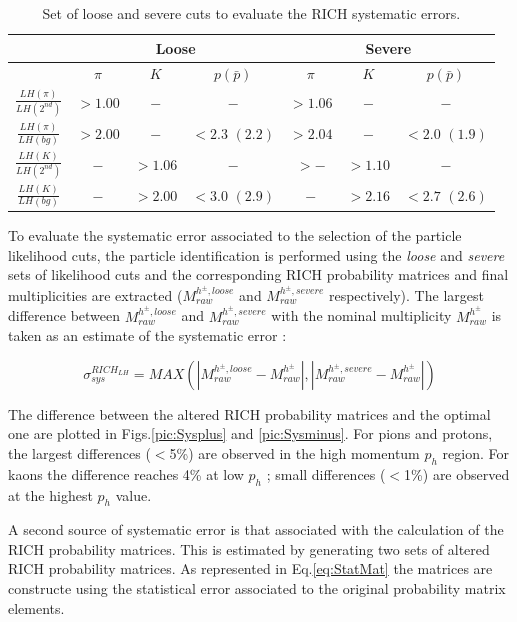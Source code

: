 \begin{table}[!h]
	\centering
	\begin{tabular}{ccccccc}
		\hline
		 & \multicolumn{3}{c}{Loose} & \multicolumn{3}{c}{Severe} \\
		\hline
		 & $\pi$ & $K$ & $p(\bar{p})$ & $\pi$ & $K$ & $p(\bar{p})$ \\
		\hline
		$\frac{LH(\pi)}{LH(2^{nd})}$ & $> 1.00$ & $-$ & $-$ & $>1.06$ & $-$ & $-$ \\
		$\frac{LH(\pi)}{LH(bg)}$ & $> 2.00$ & $-$ & $<2.3$ $(2.2)$ & $>2.04$ & $-$ & $<2.0$ $(1.9)$ \\
		$\frac{LH(K)}{LH(2^{nd})}$ & $-$ & $>1.06$ & $-$ & $>-$ & $>1.10$ & $-$ \\
		$\frac{LH(K)}{LH(bg)}$ & $-$ & $>2.00$ & $<3.0$ $(2.9)$ & $-$ & $>2.16$ & $<2.7$ $(2.6)$ \\
		\hline
	\end{tabular}
  \caption{Set of loose and severe cuts to evaluate the RICH systematic errors.}
  \label{tab:loose.severe}
\end{table}

To evaluate the systematic error associated to the selection of the particle likelihood cuts, the particle identification is performed using the \textit{loose}
and \textit{severe} sets of likelihood cuts and the corresponding RICH probability matrices and final multiplicities are extracted ($M^{h^{\pm},loose}_{raw}$
and $M^{h^{\pm},severe}_{raw}$ respectively). The largest difference between $M^{h^{\pm},loose}_{raw}$ and $M^{h^{\pm},severe}_{raw}$ with the nominal
multiplicity $M^{h^{\pm}}_{raw}$ is taken as an estimate of the systematic error :

\begin{equation}
  \sigma^{RICH_{LH}}_{sys} = MAX(|M^{h^{\pm},loose}_{raw}-M^{h^{\pm}}_{raw}|,|M^{h^{\pm},severe}_{raw}-M^{h^{\pm}}_{raw}|)
\end{equation}

The difference between the altered RICH probability matrices and the optimal one are plotted in Figs.\ref{pic:Sysplus} and \ref{pic:Sysminus}. For pions and protons, the largest differences
($<$5\%) are observed in the high momentum $p_h$ region. For kaons the difference reaches 4\% at low $p_h$ ; small differences ($<$1\%) are observed at the
highest $p_h$ value.

A second source of systematic error is that associated with the calculation of the RICH probability matrices. This is estimated by generating two sets of altered
RICH probability matrices. As represented in Eq.\ref{eq:StatMat} the matrices are constructe using the statistical error associated to the original probability matrix elements.

